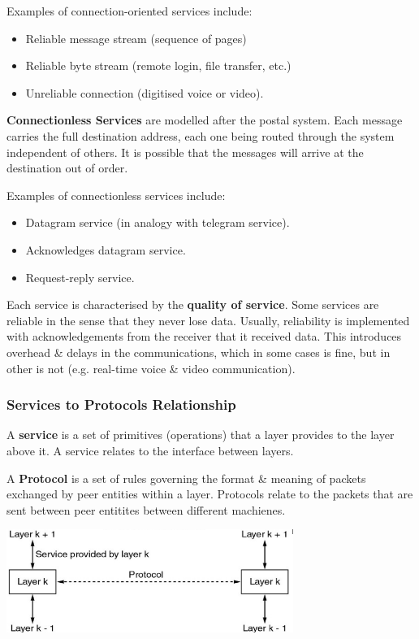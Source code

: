 \documentclass[11pt]{article}
\begin{document}
Examples of connection-oriented services include:
\begin{itemize}
    \item Reliable message stream (sequence of pages) 
    \item Reliable byte stream (remote login, file transfer, etc.)
    \item Unreliable connection (digitised voice or video). 
\end{itemize} 

\textbf{Connectionless Services} are modelled after the postal system. 
Each message carries the full destination address, each one being routed through the system independent of others. 
It is possible that the messages will arrive at the destination out of order. 

Examples of connectionless services include: 
\begin{itemize}
    \item Datagram service (in analogy with telegram service). 
    \item Acknowledges datagram service. 
    \item Request-reply service. 
\end{itemize}

Each service is characterised by the \textbf{quality of service}. 
Some services are reliable in the sense that they never lose data. 
Usually, reliability is implemented with acknowledgements from the receiver that it received data. 
This introduces overhead \& delays in the communications, which in some cases is fine, but in other is not (e.g. real-time voice \& video communication). 

\subsubsection{Services to Protocols Relationship}
A \textbf{service} is a set of primitives (operations) that a layer provides to the layer above it. 
A service relates to the interface between layers. 

A \textbf{Protocol} is a set of rules governing the format \& meaning of packets exchanged by peer entities within a layer. 
Protocols relate to the packets that are sent between peer entitites between different machienes. 

\begin{center}
    \includegraphics[width=0.7\textwidth]{services-to-protocols-relationship.png}
\end{center}
\end{document}
